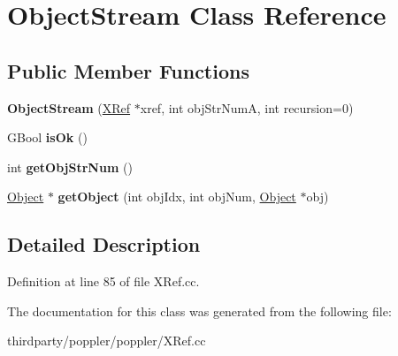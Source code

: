 \hypertarget{class_object_stream}{}\section{Object\+Stream Class Reference}
\label{class_object_stream}
\subsection*{Public Member Functions}
\begin{DoxyCompactItemize}
\item 
\mbox{\label{class_object_stream_ab9822f4ce35ec6682cdc62bfb7fae0de}} 
{\bfseries Object\+Stream} (\hyperlink{class_x_ref}{X\+Ref} $\ast$xref, int obj\+Str\+NumA, int recursion=0)
\item 
\mbox{\label{class_object_stream_a0a53733cfd89b6aedd2eabdfcff6fb8c}} 
G\+Bool {\bfseries is\+Ok} ()
\item 
\mbox{\label{class_object_stream_ae2238db20388762c55ea7d5156a78422}} 
int {\bfseries get\+Obj\+Str\+Num} ()
\item 
\mbox{\label{class_object_stream_a6cfcefd31fc93e45aa99e493b8dea6bb}} 
\hyperlink{class_object}{Object} $\ast$ {\bfseries get\+Object} (int obj\+Idx, int obj\+Num, \hyperlink{class_object}{Object} $\ast$obj)
\end{DoxyCompactItemize}


\subsection{Detailed Description}


Definition at line 85 of file X\+Ref.\+cc.



The documentation for this class was generated from the following file\+:\begin{DoxyCompactItemize}
\item 
thirdparty/poppler/poppler/X\+Ref.\+cc\end{DoxyCompactItemize}
